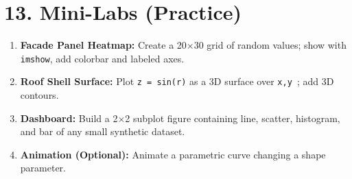 \section{13. Mini-Labs (Practice)}
\begin{enumerate}
    \item \textbf{Facade Panel Heatmap:} Create a 20×30 grid of random values; show with \texttt{imshow}, add colorbar and labeled axes.
    \item \textbf{Roof Shell Surface:} Plot \texttt{z = sin(r)} as a 3D surface over \texttt{x,y \in [-3,3]}; add 3D contours.
    \item \textbf{Dashboard:} Build a 2×2 subplot figure containing line, scatter, histogram, and bar of any small synthetic dataset.
    \item \textbf{Animation (Optional):} Animate a parametric curve changing a shape parameter.
\end{enumerate}

